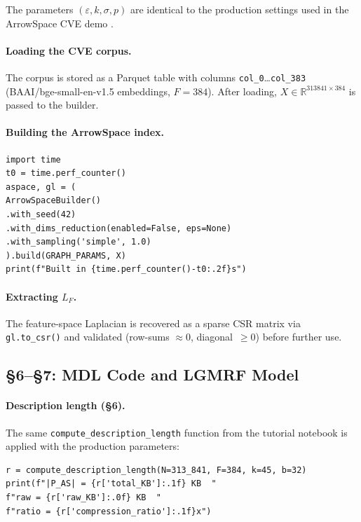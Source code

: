 \documentclass[12pt,a4paper]{article}
\theoremstyle{plain}
\theoremstyle{definition}
\theoremstyle{remark}
\newcommand{\R}{\mathbb{R}}
\newcommand{\1}{\mathbf{1}}
\begin{document}
	The parameters $(\varepsilon, k, \sigma, p)$ are identical to the
	production settings used in the ArrowSpace CVE demo
	\citep{Moriondo2025ArrowSpace}.
	
	\paragraph{Loading the CVE corpus.}
	The corpus is stored as a Parquet table with columns
	\texttt{col\_0}\ldots\texttt{col\_383} (BAAI/bge-small-en-v1.5
	embeddings, $F=384$).
	After loading, $X\in\R^{313841\times 384}$ is passed to the builder.
	
	\paragraph{Building the ArrowSpace index.}
	
	\begin{lstlisting}[caption={Building the production ArrowSpace index on CVE},
		label={lst:build}]
import time
t0 = time.perf_counter()
aspace, gl = (
ArrowSpaceBuilder()
.with_seed(42)
.with_dims_reduction(enabled=False, eps=None)
.with_sampling('simple', 1.0)
).build(GRAPH_PARAMS, X)
print(f"Built in {time.perf_counter()-t0:.2f}s")
	\end{lstlisting}
	
	\paragraph{Extracting $L_F$.}
	The feature-space Laplacian is recovered as a sparse CSR matrix via
	\texttt{gl.to\_csr()} and validated (row-sums $\approx 0$,
	diagonal~$\geq 0$) before further use.
	
	\subsection{§6--§7: MDL Code and LGMRF Model}
	
	\paragraph{Description length (§6).}
	The same \texttt{compute\_description\_length} function from the
	tutorial notebook is applied with the production parameters:
	
	\begin{lstlisting}[caption={Production description length: CVE corpus},
		label={lst:descprod}]
r = compute_description_length(N=313_841, F=384, k=45, b=32)
print(f"|P_AS| = {r['total_KB']:.1f} KB  "
f"raw = {r['raw_KB']:.0f} KB  "
f"ratio = {r['compression_ratio']:.1f}x")
	\end{lstlisting}
	
\end{document}

